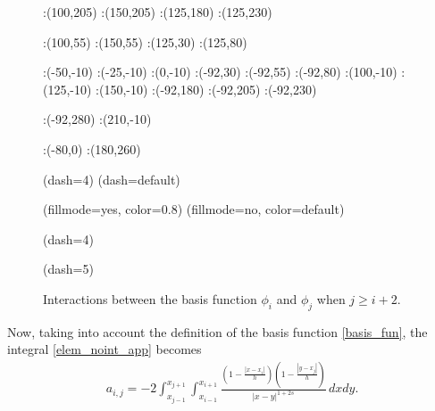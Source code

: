 {\begin{figure}[h]
:(100,205) :(150,205)
:(125,180) :(125,230)

:(100,55) :(150,55)
:(125,30) :(125,80)

:(-50,-10) :(-25,-10) :(0,-10) 
:(-92,30) :(-92,55) :(-92,80) 
:(100,-10) :(125,-10) :(150,-10) 
:(-92,180) :(-92,205) :(-92,230) 

:(-92,280) :(210,-10)


:(-80,0) :(180,260)


\figdrawbegin{}
\figdrawarrow[1,2]
\figdrawarrow[3,4]
\figset(dash=4)
\figdrawline[5,6]
\figdrawline[7,8]
\figdrawline[9,10]
\figdrawline[11,12]
\figdrawline[13,14]
\figdrawline[15,16]
\figdrawline[17,18]
\figdrawline[19,20]
\figdrawline[21,22]
\figdrawline[23,24]
\figdrawline[25,26]
\figdrawline[27,28]
\figset(dash=default)

\figset(fillmode=yes, color=0.8)
\figdrawline[33,34,36,35,33]
\figdrawline[41,42,44,43,41]
\figset (fillmode=no, color=default)
\figdrawline[33,34,36,35,33]
\figdrawline[41,42,44,43,41]

\figset(dash=4)
\figdrawline[45,46]
\figdrawline[47,48]
\figdrawline[49,50]
\figdrawline[51,52]
\figdrawline[53,54]
\figdrawline[55,56]
\figdrawline[57,58]
\figdrawline[59,60]

\figset(dash=5)
\figdrawline[75,76]

\figdrawend

\centerline{\box\figBoxA}
\caption{Interactions between the basis function $\phi_i$ and $\phi_j$ when $j\geq i+2$.}\label{upp_tri}
\end{figure}

Now, taking into account the definition of the basis function \eqref{basis_fun}, the integral \eqref{elem_noint_app} becomes
\begin{align*}
	a_{i,j}=-2 \int_{x_{j-1}}^{x_{j+1}}\int_{x_{i-1}}^{x_{i+1}}\frac{\left(1-\frac{|x-x_i|}{h}\right)\left(1-\frac{|y-x_j|}{h}\right)}{|x-y|^{1+2s}}\,dxdy.
\end{align*}

}
